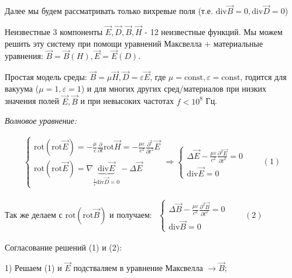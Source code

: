\documentclass[12pt, a4paper]{report}
\begin{document}
Далее мы будем рассматривать только вихревые поля (т.е. \( \mathrm{div} \vec{B} = 0 ,\mathrm{div} \vec{D} = 0  \))

Неизвестные 3 компоненты \( \vec{E},\vec{D},\vec{B},\vec{H}\) - 12 неизвестные функций. Мы можем решить эту систему при помощи уравнений Максвелла \( + \)  материальные уравнения: \( \vec{B}=\vec{B}(H), \vec{E}=\vec{E}(D) \).

Простая модель среды: \( \vec{B}=\mu\vec{H}, \vec{D}=\varepsilon \vec{E} \), где \( \mu = \mathrm{const}  , \varepsilon =\mathrm{const}   \), годится для вакуума (\(\mu=1, \varepsilon=1  \)) и для многих других сред/материалов при низких значения полей \( \vec{E}, \vec{B} \)  и при невысоких частотах \( f < 10^8 \) Гц. 
 
\textit{Волновое уравнение:} 

\[ 
\begin{aligned}
    \begin{cases}{}
        \displaystyle  \mathrm{rot} (\mathrm{rot} \vec{E}  )= -\frac{\mu}{c}  \frac{\partial}{\partial t} \mathrm{rot } \vec{H}= - \frac{\mu \varepsilon}{ c ^2} \frac{\partial ^2}{\partial t ^2}     \vec{E} \\
        \displaystyle \mathrm{rot} (\mathrm{rot} \vec{E}  )= \nabla \underbrace{\mathrm{div} \vec{E}}_{\frac{1}{\varepsilon} \mathrm{div}\vec{D}=0   }    - \Delta \vec{E}   
    \end{cases}
    \Rightarrow
    \begin{cases}
        \displaystyle \Delta \vec{E}- \frac{\mu \varepsilon}{c ^2} \frac{\partial ^2 \vec{E}}{\partial t ^2} =0 \\
        \displaystyle \mathrm{div}   \vec{E}=0 
    \end{cases} 
    \quad \quad  (1)
\end{aligned} 
\] 

Так же делаем с \( \mathrm{rot }(\mathrm{rot}\vec{B})\) и получаем: \( 
\begin{aligned}
    \begin{cases}
        \displaystyle  \Delta \vec{B} - \frac{\mu \varepsilon}{c ^2} \frac{\partial ^2 \vec{B}}{\partial t ^2} =0 \\
        \displaystyle \mathrm{div}   \vec{B}=0
    \end{cases}
    \quad \quad  (2)
\end{aligned} 
\)  

Согласование решений (1) и (2): 

1) Решаем (1) и \( \vec{E} \)  подстваляем в уравнение Максвелла \( \to  \vec{B} \);
\end{document}
